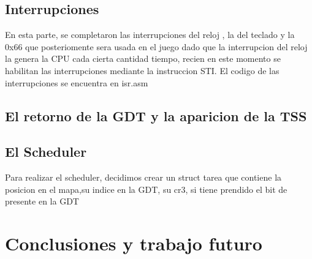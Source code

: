 \documentclass[a4paper]{article}
\newenvironment{codesnippet}{%
	\begin{Sbox}\begin{minipage}{\textwidth}\sffamily\small}%
	{\end{minipage}\end{Sbox}%
		\begin{center}%
		\vspace{-0.4cm}\colorbox{litegrey}{\TheSbox}\end{center}\vspace{0.3cm}}
\begin{document}
\subsection{Interrupciones}
En esta parte, se completaron las interrupciones del reloj , la del teclado y la 0x66 que posteriomente sera usada en el juego
dado que la interrupcion del reloj la genera la CPU cada cierta cantidad tiempo, recien en este momento se habilitan las interrupciones mediante la instruccion STI.
El codigo de las interrupciones se encuentra en isr.asm 

\subsection{El retorno de la GDT y la aparicion de la TSS}

\subsection{El Scheduler}
Para realizar el scheduler, decidimos crear un struct tarea que contiene la posicion en el mapa,su indice en la GDT, su cr3, si tiene prendido el bit de presente en la GDT

\section{Conclusiones y trabajo futuro}






\end{document}
